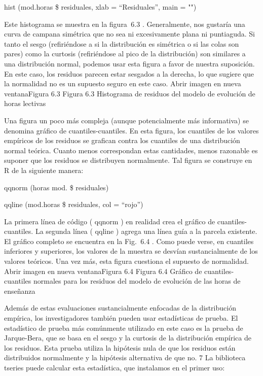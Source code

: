 \documentclass[
]{book}
\begin{document}
hist (mod.horas \$ residuales, xlab = ``Residuales'', main = "")

Este histograma se muestra en la figura  6.3 . Generalmente, nos gustaría una curva de campana simétrica que no sea ni excesivamente plana ni puntiaguda. Si tanto el sesgo (refiriéndose a si la distribución es simétrica o si las colas son pares) como la curtosis (refiriéndose al pico de la distribución) son similares a una distribución normal, podemos usar esta figura a favor de nuestra suposición. En este caso, los residuos parecen estar sesgados a la derecha, lo que sugiere que la normalidad no es un supuesto seguro en este caso.
Abrir imagen en nueva ventanaFigura 6.3
Figura 6.3
Histograma de residuos del modelo de evolución de horas lectivas

Una figura un poco más compleja (aunque potencialmente más informativa) se denomina gráfico de cuantiles-cuantiles. En esta figura, los cuantiles de los valores empíricos de los residuos se grafican contra los cuantiles de una distribución normal teórica. Cuanto menos correspondan estas cantidades, menos razonable es suponer que los residuos se distribuyen normalmente. Tal figura se construye en R de la siguiente manera:

qqnorm (horas mod. \$ residuales)

qqline (mod.horas \$ residuales, col = ``rojo'')

La primera línea de código ( qqnorm ) en realidad crea el gráfico de cuantiles-cuantiles. La segunda línea ( qqline ) agrega una línea guía a la parcela existente. El gráfico completo se encuentra en la Fig.  6.4 . Como puede verse, en cuantiles inferiores y superiores, los valores de la muestra se desvían sustancialmente de los valores teóricos. Una vez más, esta figura cuestiona el supuesto de normalidad.
Abrir imagen en nueva ventanaFigura 6.4
Figura 6.4
Gráfico de cuantiles-cuantiles normales para los residuos del modelo de evolución de las horas de enseñanza

Además de estas evaluaciones sustancialmente enfocadas de la distribución empírica, los investigadores también pueden usar estadísticas de prueba. El estadístico de prueba más comúnmente utilizado en este caso es la prueba de Jarque-Bera, que se basa en el sesgo y la curtosis de la distribución empírica de los residuos. Esta prueba utiliza la hipótesis nula de que los residuos están distribuidos normalmente y la hipótesis alternativa de que no. 7 La biblioteca tseries puede calcular esta estadística, que instalamos en el primer uso:
\end{document}
